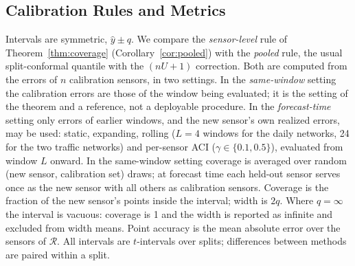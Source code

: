 \subsection{Calibration Rules and Metrics}
Intervals are symmetric, $\hat y\pm q$. We compare the \emph{sensor-level} rule of
Theorem~\ref{thm:coverage} (Corollary~\ref{cor:pooled}) with the \emph{pooled} rule, the usual
split-conformal quantile with the $(nU+1)$ correction. Both are computed from the errors of $n$
calibration sensors, in two settings. In the \emph{same-window} setting the calibration errors are those
of the window being evaluated; it is the setting of the theorem and a reference, not a deployable
procedure. In the \emph{forecast-time} setting only errors of earlier windows, and the new sensor's own
realized errors, may be used: static, expanding, rolling ($L=4$ windows for the daily networks, 24 for
the two traffic networks) and per-sensor ACI ($\gamma\in\{0.1,0.5\}$), evaluated from window $L$ onward. In the
same-window setting coverage is averaged over random (new sensor, calibration set) draws; at forecast time each
held-out sensor serves once as the new sensor with all others as calibration sensors. Coverage is the fraction of
the new sensor's points inside the interval; width is $2q$. Where $q=\infty$ the
interval is vacuous: coverage is 1 and the width is reported as infinite and excluded from width means.
Point accuracy is the mean absolute error over the sensors of $\mathcal{R}$. All intervals are
$t$-intervals over splits; differences between methods are paired within a split.
